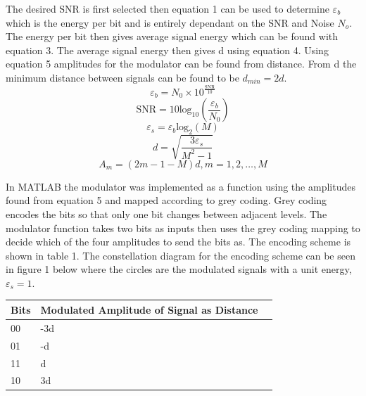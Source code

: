 \documentclass{article}
\begin{document}
The desired SNR is first selected then equation 1 can be used to determine $\varepsilon_b$ which is the energy per bit and is entirely dependant on the SNR and Noise $N_o$. The energy per bit then gives average signal energy which can be found with equation 3. The average signal energy then gives d using equation 4. Using equation 5 amplitudes for the modulator can be found from distance. From d the minimum distance between signals can be found to be  $d_{min} = 2d$.
\begin{equation}
    \varepsilon_{b} = N_0 \times 10^{ \frac{ \text{SNR}}{10} }
\end{equation}
\begin{equation}
    \text{SNR} = 10\text{log}_{10}(\frac{\varepsilon_{b}}{N_0}) 
\end{equation}
\begin{equation}
    \varepsilon_{s} = \varepsilon_{b}\text{log}_2(M) 
\end{equation}
\begin{equation}
    d = \sqrt{\frac{3 \varepsilon_{s}}{M^2 - 1}} 
\end{equation}
\begin{equation}
    A_m = (2m - 1 - M)d, m = 1,2, \dots, M
\end{equation}
\begin{center}

\end{center}
In MATLAB the modulator was implemented as a function using the amplitudes found from equation 5 and mapped according to grey coding. Grey coding encodes the bits so that only one bit changes between adjacent levels. The modulator function takes two bits as inputs then uses the grey coding mapping to decide which of the four amplitudes to send the bits as. The encoding scheme is shown in table 1. The constellation diagram for the encoding scheme can be seen in figure 1 below where the circles are the modulated signals with a unit energy, $\varepsilon_s = 1$.
\begin{center}

\begin{tabular}{|l|l|l|} \hline
Bits & Modulated Amplitude of Signal as Distance  \\ \hline
00   & -3d\\ \hline
01   & -d     \\ \hline
11   & d  \\ \hline
10   & 3d      \\ \hline
\end{tabular}
\end{center}
\end{document}
